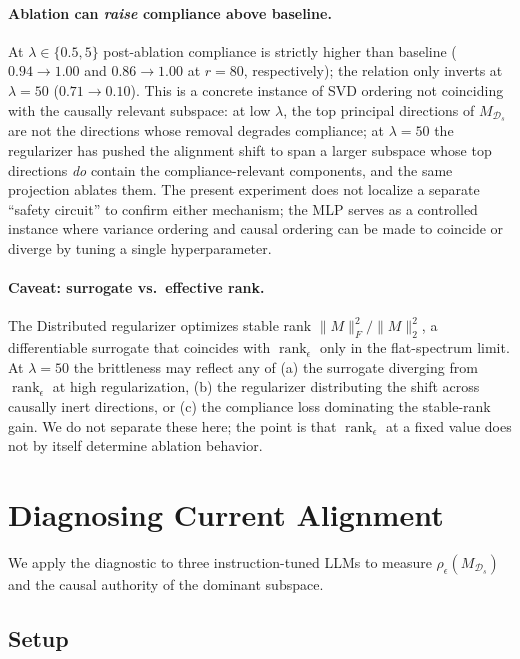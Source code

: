 \documentclass[10pt]{article}
\theoremstyle{definition}
\theoremstyle{remark}
\begin{document}
\paragraph{Ablation can \emph{raise} compliance above
baseline.}
At $\lambda \in \{0.5, 5\}$ post-ablation compliance is
strictly higher than baseline ($0.94 \to 1.00$ and
$0.86 \to 1.00$ at $r{=}80$, respectively); the
relation only inverts at $\lambda{=}50$ ($0.71 \to
0.10$).  This is a concrete instance of SVD ordering
not coinciding with the causally relevant subspace:
at low $\lambda$, the top principal directions of
$M_{\mathcal{D}_s}$ are not the directions whose
removal degrades compliance; at $\lambda{=}50$ the
regularizer has pushed the alignment shift to span a
larger subspace whose top directions \emph{do} contain
the compliance-relevant components, and the same
projection ablates them.  The present experiment does
not localize a separate ``safety circuit'' to confirm
either mechanism; the MLP serves as a controlled
instance where variance ordering and causal ordering
can be made to coincide or diverge by tuning a single
hyperparameter.

\paragraph{Caveat: surrogate vs.\ effective rank.}
The Distributed regularizer optimizes stable rank
$\|M\|_F^2/\|M\|_2^2$, a differentiable surrogate that
coincides with $\operatorname{rank}_{\epsilon}$ only in
the flat-spectrum limit.  At $\lambda{=}50$ the
brittleness may reflect any of (a) the surrogate
diverging from $\operatorname{rank}_{\epsilon}$ at high
regularization, (b) the regularizer distributing the
shift across causally inert directions, or (c) the
compliance loss dominating the stable-rank gain.  We do
not separate these here; the point is that
$\operatorname{rank}_{\epsilon}$ at a fixed value does
not by itself determine ablation behavior.


\section{Diagnosing Current Alignment}
\label{sec:diagnosis}

We apply the diagnostic to three instruction-tuned LLMs
to measure $\rho_{\epsilon}(M_{\mathcal{D}_s})$ and the
causal authority of the dominant subspace.

\subsection{Setup}
\label{sec:diagnosis_setup}
\end{document}
